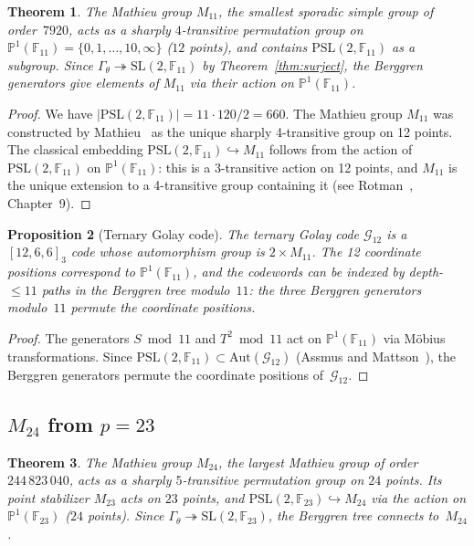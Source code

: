 \documentclass[12pt]{amsart}
\newtheorem{theorem}{Theorem}[section]
\newtheorem{proposition}[theorem]{Proposition}
\theoremstyle{definition}
\theoremstyle{remark}
\newcommand{\SL}{\mathrm{SL}}
\newcommand{\PSL}{\mathrm{PSL}}
\newcommand{\Aut}{\mathrm{Aut}}
\newcommand{\PP}{\mathbb{P}}
\newcommand{\Gtheta}{\Gamma_\theta}
\begin{document}
\begin{theorem}\label{thm:m11}
The Mathieu group $M_{11}$, the smallest sporadic simple group of
order~$7920$, acts as a sharply $4$-transitive permutation group on
$\PP^1(\mathbb{F}_{11}) = \{0,1,\ldots,10,\infty\}$ ($12$ points),
and contains $\PSL(2,\mathbb{F}_{11})$ as a subgroup.  Since
$\Gtheta \twoheadrightarrow \SL(2,\mathbb{F}_{11})$ by
Theorem~\ref{thm:surject}, the Berggren generators give elements of
$M_{11}$ via their action on $\PP^1(\mathbb{F}_{11})$.
\end{theorem}

\begin{proof}
We have $|\PSL(2,\mathbb{F}_{11})| = 11 \cdot 120/2 = 660$.
The Mathieu group $M_{11}$ was constructed by Mathieu~\cite{mathieu}
as the unique sharply 4-transitive group on 12 points.  The
classical embedding $\PSL(2,\mathbb{F}_{11}) \hookrightarrow M_{11}$
follows from the action of $\PSL(2,\mathbb{F}_{11})$ on
$\PP^1(\mathbb{F}_{11})$: this is a 3-transitive action on 12
points, and $M_{11}$ is the unique extension to a 4-transitive group
containing it (see Rotman~\cite{rotman}, Chapter~9).
\end{proof}

\begin{proposition}[Ternary Golay code]\label{prop:golay12}
The ternary Golay code $\mathcal{G}_{12}$ is a $[12, 6, 6]_3$ code
whose automorphism group is $2 \times M_{11}$.  The 12 coordinate
positions correspond to $\PP^1(\mathbb{F}_{11})$, and the codewords
can be indexed by depth-$\le 11$ paths in the Berggren tree modulo~$11$:
the three Berggren generators modulo~$11$ permute the coordinate
positions.
\end{proposition}

\begin{proof}
The generators $S \bmod 11$ and $T^2 \bmod 11$ act on
$\PP^1(\mathbb{F}_{11})$ via M\"obius transformations.
Since $\PSL(2,\mathbb{F}_{11}) \subset \Aut(\mathcal{G}_{12})$
(Assmus and Mattson~\cite{assmus-mattson}), the Berggren generators
permute the coordinate positions of~$\mathcal{G}_{12}$.
\end{proof}

\subsection{$M_{24}$ from $p = 23$}

\begin{theorem}\label{thm:m24}
The Mathieu group $M_{24}$, the largest Mathieu group of order
$244\,823\,040$, acts as a sharply $5$-transitive permutation group
on $24$ points.  Its point stabilizer $M_{23}$ acts on $23$ points,
and $\PSL(2,\mathbb{F}_{23}) \hookrightarrow M_{24}$ via the action
on $\PP^1(\mathbb{F}_{23})$ ($24$ points).  Since
$\Gtheta \twoheadrightarrow \SL(2,\mathbb{F}_{23})$, the Berggren
tree connects to~$M_{24}$.
\end{theorem}
\end{document}

